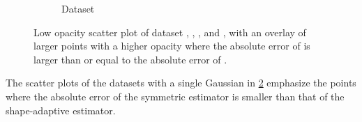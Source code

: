 \begin{figure}
\begin{subfigure}{0.23\textwidth}
		\caption{Dataset \baakmanFive}
		\label{fig:discussion:singleSphere:mbeLowerError:baakman5}
	\end{subfigure}			
	\caption{Low opacity scatter plot of dataset %
		 \ferdosiOne, %
		 \baakmanOne, %
		 \baakmanFour, and%
		 \baakmanFive, %
		with an overlay of larger points with a higher opacity where the absolute error of \sambe is larger than or equal to the absolute error of \mbe.}
	\label{fig:discussion:singleSphere:mbeLowerError}
\end{figure}

The scatter plots of the datasets with a single Gaussian in \cref{fig:discussion:singleSphere:mbeLowerError} emphasize the points where the absolute error of the symmetric estimator is smaller than that of the shape-adaptive estimator. 

		





